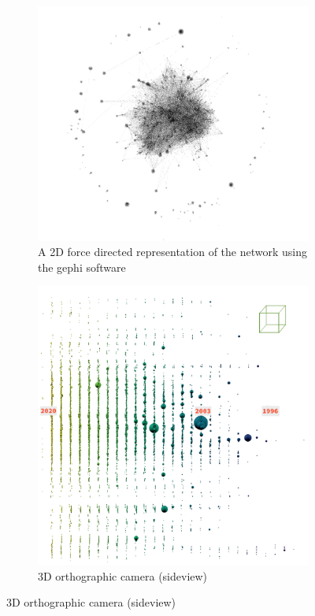 \begin{figure}[H] %
     \centering
     \hfill
     \begin{subfigure}{0.495\textwidth}
         \centering
         \includegraphics[width=\textwidth]{figures_c3/gephiall.png}
         \caption{A 2D force directed representation of the network using the gephi software \citep{gephi}}
         \label{fig:gall}
     \end{subfigure}
     \hfill
     \begin{subfigure}{0.47\textwidth}
         \centering
         \includegraphics[width=\textwidth]{figures_c3/sideall.png}
         \caption{3D orthographic camera (sideview)}
         \label{fig:sideweb}
     \end{subfigure}
     \hfill


\end{figure}
